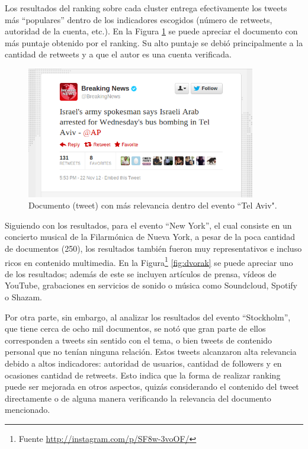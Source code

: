 \documentclass[upright, contnum]{umemoria}
\begin{document}
    Los resultados del ranking sobre cada cluster entrega
    efectivamente los tweets más ``populares'' dentro de los indicadores
    escogidos (número de retweets, autoridad de la cuenta, etc.). En
    la Figura \ref{fig:bn} se puede apreciar el documento con más
    puntaje obtenido por el ranking. Su alto puntaje se debió
    principalmente a la cantidad de retweets y a que el autor es una
    cuenta verificada.

\begin{figure}[h]
  \centering
  \includegraphics[width=10cm]{./img/breakingnews.png}
  \caption[Documento con alto puntaje entre los resultados obtenidos]
   { Documento (tweet) con más relevancia dentro del evento ``Tel Aviv". \label{fig:bn} }
\end{figure}

    Siguiendo con los resultados, para el evento ``New York'', el cual consiste en un
    concierto musical de la Filarmónica de Nueva York, a pesar de la
    poca cantidad de documentos (250), los resultados también fueron
    muy representativos e incluso ricos en contenido multimedia. En la
    Figura\footnote{Fuente \href{http://instagram.com/p/SF8w-3voOF/}{http://instagram.com/p/SF8w-3voOF/} }
    \ref{fig:dvorak} se puede apreciar uno de los resultados; además
    de este se incluyen artículos de prensa, vídeos de YouTube,
    grabaciones en servicios de sonido o música como Soundcloud,
    Spotify o Shazam.

    Por otra parte, sin embargo, al analizar los resultados del evento
    ``Stockholm'', que tiene cerca de ocho mil documentos, se notó que
    gran parte de ellos corresponden a tweets sin sentido con el tema,
    o bien tweets de contenido personal que no tenían ninguna
    relación. Estos tweets alcanzaron alta relevancia debido a altos
    indicadores: autoridad de usuarios, cantidad de followers y en
    ocasiones cantidad de retweets. Esto indica que la forma de
    realizar ranking puede ser mejorada en otros aspectos, quizás
    considerando el contenido del tweet directamente o de alguna
    manera verificando la relevancia del documento mencionado.
    
\end{document}
